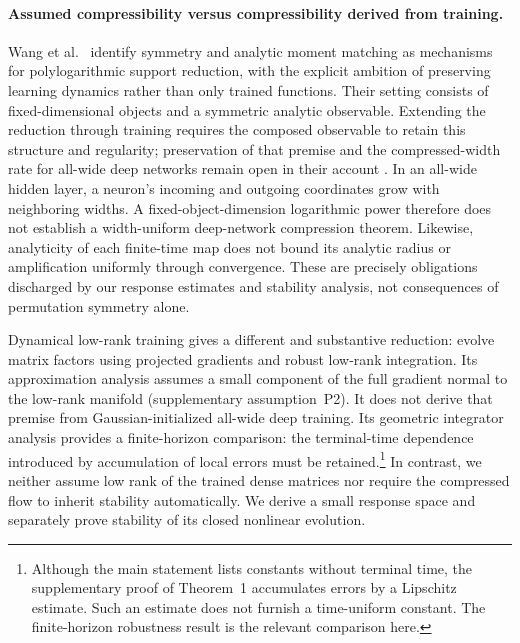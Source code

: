 \documentclass[11pt]{article}
\theoremstyle{definition}
\theoremstyle{remark}
\begin{document}
\paragraph{Assumed compressibility versus compressibility derived from training.}
Wang et al.\ \cite{wang2026universal} identify symmetry and analytic moment
matching as mechanisms for polylogarithmic support reduction, with the
explicit ambition of preserving learning dynamics rather than only trained
functions. Their setting consists of fixed-dimensional objects and a
symmetric analytic observable. Extending the reduction through training
requires the composed observable to retain this structure and regularity;
preservation of that premise and the compressed-width rate for all-wide
deep networks remain open in their account
\cite[Theorem~5 and Section~5]{wang2026universal}.
In an all-wide hidden layer, a neuron's
incoming and outgoing coordinates grow with neighboring widths. A
fixed-object-dimension logarithmic power therefore does not establish a
width-uniform deep-network compression theorem. Likewise, analyticity of
each finite-time map does not bound its analytic radius or amplification
uniformly through convergence. These are precisely obligations discharged
by our response estimates and stability analysis, not consequences of
permutation symmetry alone.

Dynamical low-rank training \cite{schotthofer2022lottery} gives a different
and substantive reduction: evolve matrix factors using projected gradients
and robust low-rank integration. Its approximation analysis assumes a small
component of the full gradient normal to the low-rank manifold
(supplementary assumption~P2). It does not derive that premise from
Gaussian-initialized all-wide deep training. Its geometric integrator analysis
provides a finite-horizon comparison: the terminal-time dependence introduced
by accumulation of local errors must be retained.\footnote{Although the main
statement lists constants without terminal time, the supplementary proof
of Theorem~1 accumulates errors by a Lipschitz estimate. Such an estimate
does not furnish a time-uniform constant. The finite-horizon robustness
result is the relevant comparison here.}
In contrast, we neither assume low rank of the trained dense
matrices nor require the compressed flow to inherit stability automatically.
We derive a small response space and separately prove stability of its
closed nonlinear evolution.
\end{document}
